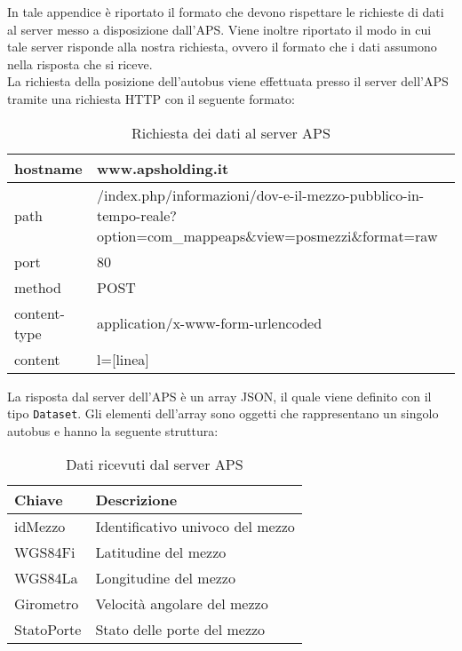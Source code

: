  \label{app:aps}
In tale appendice è riportato il formato che devono rispettare le richieste di dati al server messo a disposizione dall'APS. Viene inoltre riportato il modo in cui tale server risponde alla nostra richiesta, ovvero il formato che i dati assumono nella risposta che si riceve.\\
La richiesta della posizione dell'autobus viene effettuata presso il server dell'APS tramite una richiesta HTTP con il seguente formato:

\begin{table}[H]
	\centering
	\begin{tabu}{| X[0.4] | X |}
		\hline
		hostname & www.apsholding.it \\ \hline
		path & /index.php/informazioni/dov-e-il-mezzo-pubblico-in-tempo-reale?option=com\_mappeaps\&view=posmezzi\&format=raw  \\ \hline
		port & 80 \\ \hline		
		method & POST \\ \hline 
		content-type & application/x-www-form-urlencoded \\ \hline
		content & l=[linea] \\ \hline
	\end{tabu}
	\caption{Richiesta dei dati al server APS}
\end{table}

La risposta dal server dell'APS è un array JSON, il quale viene definito con il tipo \texttt{Dataset}. Gli elementi dell'array sono oggetti che rappresentano un singolo autobus e hanno la seguente struttura:

\begin{table}[H]
	\centering
	\begin{tabu}{| X[0.4] | X |}
		\hline
		\rowfont{\bfseries}
		Chiave & Descrizione \\ \hline
		idMezzo & Identificativo univoco del mezzo \\ \hline
		WGS84Fi & Latitudine del mezzo \\ \hline
		WGS84La & Longitudine del mezzo \\ \hline
		Girometro & Velocità angolare del mezzo \\ \hline
		StatoPorte & Stato delle porte del mezzo \\ \hline
	\end{tabu}
	\caption{Dati ricevuti dal server APS}
\end{table}